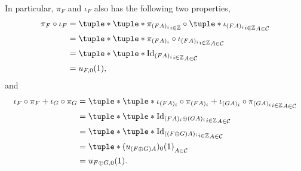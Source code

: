 \begin{remark}
    In particular, \( \pi_F \) and \( \iota_F \) also has the following two properties,
    \begin{align*}
        \pi_F \circ \iota_F &= \tuple*{ \tuple*{ \pi_{(F A)_i} }_{i \in \Zb} \circ \tuple*{ \iota_{(F A)_i} }_{i \in \Zb} }_{A \in \Cc} \\
        &= \tuple*{ \tuple*{ \pi_{(F A)_i} \circ \iota_{(F A)_i} }_{i \in \Zb} }_{A \in \Cc} \\
        &= \tuple*{ \tuple*{ \Id_{(F A)_i} }_{i \in \Zb} }_{A \in \Cc} \\
        &= u_{F, 0}(1),
    \end{align*}
    and
    \begin{align*}
        \iota_F \circ \pi_F + \iota_G \circ \pi_G &= \tuple*{ \tuple*{\iota_{(F A)_i} \circ \pi_{(F A)_i} + \iota_{(G A)_i} \circ \pi_{(G A)_i} }_{i \in \Zb} }_{A \in \Cc} \\
        &= \tuple*{ \tuple*{ \Id_{(F A)_i \oplus (G A)_i} }_{i \in \Zb} }_{A \in \Cc} \\
        &= \tuple*{ \tuple*{ \Id_{((F \oplus G) A)_i} }_{i \in \Zb} }_{A \in \Cc} \\
        &= \tuple*{ (u_{(F \oplus G) A})_0 (1)}_{A \in \Cc} \\
        &= u_{F \oplus G, 0} (1).
    \end{align*}
\end{remark}

